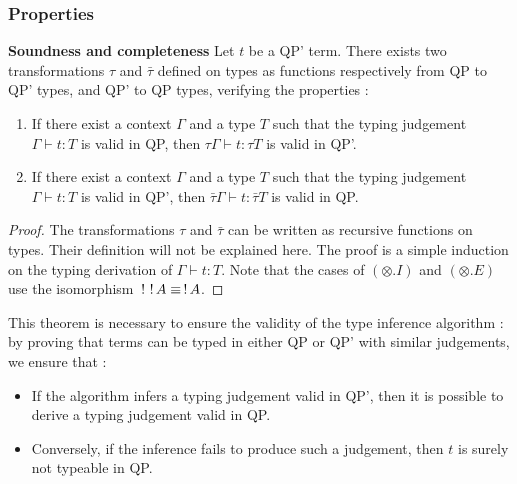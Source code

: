 \subsubsection{Properties}

\begin{thm}{\bf Soundness and completeness} Let $t$ be a QP' term. There exists two transformations $\tau$ and
	$\bar \tau$ defined on types as functions respectively from QP to QP' types, and QP' to QP types, verifying the properties :
	\begin{enumerate}
		\item If there exist a context $\Gamma$ and a type $T$ such that the typing judgement $\Gamma \vdash t : T$ is valid in QP, then
			$\tau\Gamma \vdash t : \tau T$ is valid in QP'.
		\item If there exist a context $\Gamma$ and a type $T$ such that the typing judgement $\Gamma \vdash t : T$ is valid in QP', then
			$\bar \tau \Gamma \vdash t : \bar \tau T$ is valid in QP.
	\end{enumerate}
	
	\begin{proof}
		The transformations $\tau$ and $\bar \tau$ can be written as recursive functions on types. Their definition will not be explained
		here. The proof is a simple induction on the typing derivation of $\Gamma \vdash t : T$. Note that the cases of $(\otimes.I)$ and
		$(\otimes.E)$ use the isomorphism $\,!\,\,!\, A \equiv \,!\, A$.
	\end{proof}
\end{thm}

\begin{remark}
	This theorem is necessary to ensure the validity of the type inference algorithm : by proving that
	terms can be typed in either QP or QP' with similar judgements, we ensure that :
	\begin{itemize}
		\item If the algorithm infers a typing judgement valid in QP', then it is possible to derive a typing judgement valid in QP.
		\item Conversely, if the inference fails to produce such a judgement, then $t$ is surely not typeable in QP.
	\end{itemize}
\end{remark}

